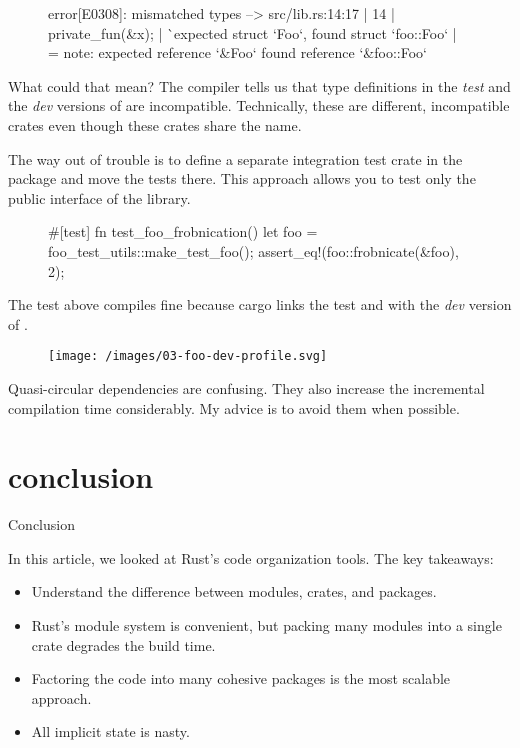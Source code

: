 \documentclass{article}
\begin{document}
\begin{figure}
\begin{code}[bad]
error[E0308]: mismatched types
  --> src/lib.rs:14:17
   |
14 |     private_fun(&x);
   |                 ^^ expected struct `Foo`, found struct `foo::Foo`
   |
   = note: expected reference `&Foo`
              found reference `&foo::Foo`
\end{code}
\end{figure}

What could that mean?
The compiler tells us that type definitions in the \emph{test} and the \emph{dev} versions of  are incompatible.
Technically, these are different, incompatible crates even though these crates share the name.

The way out of trouble is to define a separate integration test crate in the  package and move the tests there.
This approach allows you to test only the public interface of the  library.

\begin{figure}
\begin{code}[good]
#[test]
fn test_foo_frobnication() {
    let foo = foo_test_utils::make_test_foo();
    assert_eq!(foo::frobnicate(&foo), 2);
}
\end{code}
\end{figure}

The test above compiles fine because cargo links the test and  with the \emph{dev} version of .

\begin{figure}[grayscale-diagram]
  \texttt{[image: /images/03-foo-dev-profile.svg]}
\end{figure}

Quasi-circular dependencies are confusing.
They also increase the incremental compilation time considerably.
My advice is to avoid them when possible.

\section{conclusion}{Conclusion}

In this article, we looked at Rust's code organization tools.
The key takeaways:
\begin{itemize}
  \item 
    Understand the difference between modules, crates, and packages.
  \item 
    Rust's module system is convenient, but packing many modules into a single crate degrades the build time.
  \item 
    Factoring the code into many cohesive packages is the most scalable approach.
  \item 
    All implicit state is nasty.
\end{itemize}
\end{document}

